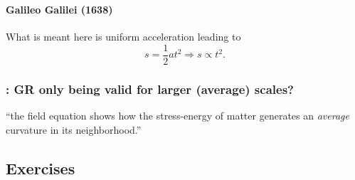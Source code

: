 \subsubsection{ }
\paragraph{Galileo Galilei (1638)}
What is meant here is uniform acceleration leading to
\[s=\dfrac{1}{2}a t^2 \Rightarrow s \propto t^2.\]

\subsubsection{\hint: GR only being valid for larger (average) scales? }
\enquote{the field equation shows how the stress-energy of matter generates an \emph{average} curvature in its neighborhood.}

\subsection{Exercises}\label{susec:1_E}
\subsubsection{ }

\subsubsection{ }

\subsubsection{ }

